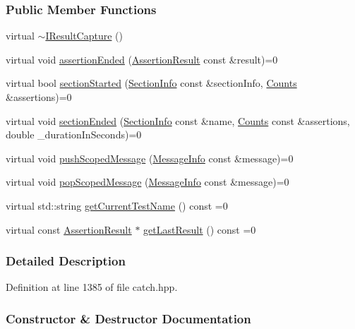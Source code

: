 \subsubsection*{Public Member Functions}
\begin{DoxyCompactItemize}
\item 
virtual \hyperlink{a00040_a3bd16719d6772b7470887fc36c6d0808}{$\sim$\+I\+Result\+Capture} ()
\item 
virtual void \hyperlink{a00040_ae45e08bccc5fb434656d4f2e44742223}{assertion\+Ended} (\hyperlink{a00005}{Assertion\+Result} const \&result)=0
\item 
virtual bool \hyperlink{a00040_a5b76ed52badcb64cf374202e12b81a03}{section\+Started} (\hyperlink{a00073}{Section\+Info} const \&section\+Info, \hyperlink{a00015}{Counts} \&assertions)=0
\item 
virtual void \hyperlink{a00040_a110d3d300709d114b3e4718fff021b29}{section\+Ended} (\hyperlink{a00073}{Section\+Info} const \&name, \hyperlink{a00015}{Counts} const \&assertions, double \+\_\+duration\+In\+Seconds)=0
\item 
virtual void \hyperlink{a00040_a91d154c1e087e383dcde5aad95cb6a05}{push\+Scoped\+Message} (\hyperlink{a00050}{Message\+Info} const \&message)=0
\item 
virtual void \hyperlink{a00040_a42bcb13276706bf8c3ce081ce16d37fd}{pop\+Scoped\+Message} (\hyperlink{a00050}{Message\+Info} const \&message)=0
\item 
virtual std\+::string \hyperlink{a00040_aea1617f4a84cc648246aa3ed6918b5bf}{get\+Current\+Test\+Name} () const =0
\item 
virtual const \hyperlink{a00005}{Assertion\+Result} $\ast$ \hyperlink{a00040_ab18872c89fab97405a56e9c6a4919736}{get\+Last\+Result} () const =0
\end{DoxyCompactItemize}


\subsubsection{Detailed Description}


Definition at line 1385 of file catch.\+hpp.



\subsubsection{Constructor \& Destructor Documentation}
\hypertarget{a00040_a3bd16719d6772b7470887fc36c6d0808}{}

